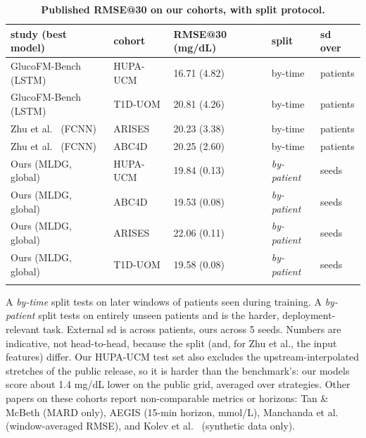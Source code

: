 \documentclass[10pt,letterpaper]{article}
\newlength\savedwidth
\newcommand\thickhline{\noalign{\global\savedwidth\arrayrulewidth\global\arrayrulewidth 2pt}%
\hline
\noalign{\global\arrayrulewidth\savedwidth}}
\begin{document}
\begin{table}[!ht]
\centering
\captionsetup{justification=centering,singlelinecheck=on}
\caption{\bf Published RMSE@30 on our cohorts, with split protocol.}
\label{tab:prior}
\begin{tabular}{lllll}
\thickhline
study (best model) & cohort & RMSE@30 (mg/dL) & split & sd over \\
\hline
GlucoFM-Bench \cite{lu2026glucofmbench} (LSTM) & HUPA-UCM & 16.71 (4.82) & by-time & patients \\
GlucoFM-Bench \cite{lu2026glucofmbench} (LSTM) & T1D-UOM  & 20.81 (4.26) & by-time & patients \\
Zhu et al.\ \cite{zhu2023fcnn} (FCNN)          & ARISES   & 20.23 (3.38) & by-time & patients \\
Zhu et al.\ \cite{zhu2023fcnn} (FCNN)          & ABC4D    & 20.25 (2.60) & by-time & patients \\
\hline
Ours (MLDG, global)            & HUPA-UCM & 19.84 (0.13) & \emph{by-patient} & seeds \\
Ours (MLDG, global)            & ABC4D    & 19.53 (0.08) & \emph{by-patient} & seeds \\
Ours (MLDG, global)            & ARISES   & 22.06 (0.11) & \emph{by-patient} & seeds \\
Ours (MLDG, global)            & T1D-UOM  & 19.58 (0.08) & \emph{by-patient} & seeds \\
\thickhline
\end{tabular}
\begin{center}
{\small A \emph{by-time} split tests on later windows of patients seen during
training. A \emph{by-patient} split tests on entirely unseen patients and is the
harder, deployment-relevant task. External sd is across patients, ours across
5 seeds. Numbers are indicative, not head-to-head, because the split (and, for
Zhu et al., the input features) differ. Our HUPA-UCM test set also excludes
the upstream-interpolated stretches of the public release, so it is harder
than the benchmark's: our models score about 1.4 mg/dL lower on the public
grid, averaged over strategies. Other papers on these cohorts report
non-comparable metrics or horizons: Tan \& McBeth \cite{tan2026uncertainty}
(MARD only), AEGIS \cite{pansheriya2026aegis} (15-min horizon, mmol/L),
Manchanda et al.\ \cite{manchanda2025lstm} (window-averaged RMSE), and Kolev
et al.\ \cite{kolev2026benchmark} (synthetic data only).}
\end{center}
\end{table}
\end{document}
